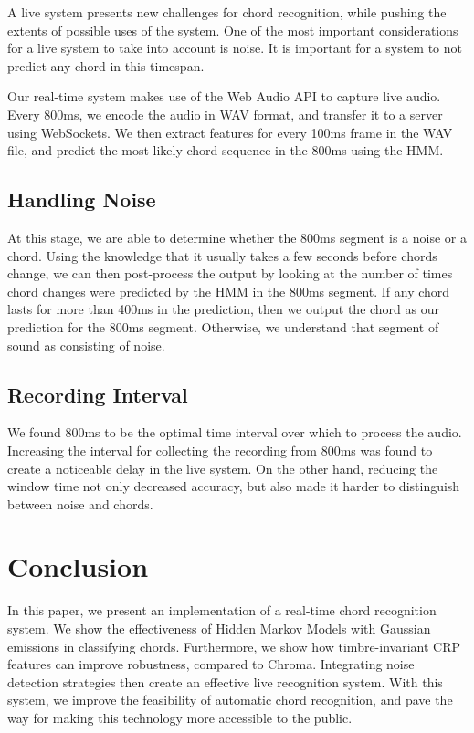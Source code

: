 \documentclass{article}
\begin{document}
A live system presents new challenges for chord recognition, while pushing the
extents of possible uses of the system.
One of the most important considerations for a live system to take into account
is noise. It is important for a system to not predict any chord in this
timespan.

Our real-time system makes use of the Web Audio API to capture live audio. Every
800ms, we encode the audio in WAV format, and transfer it to a server using
WebSockets. We then extract features for every 100ms frame in the WAV file, and
predict the most likely chord sequence in the 800ms using the HMM.

\subsection{Handling Noise}
At this stage, we are able to determine whether the 800ms segment is a noise or
a chord. Using the knowledge that it usually takes a few seconds before chords
change, we can then post-process the output by looking at the number of times
chord changes were predicted by the HMM in the 800ms segment. If any chord lasts
for more than 400ms in the prediction, then we output the chord as our
prediction for the 800ms segment. Otherwise, we understand that segment of sound
as consisting of noise.

\subsection{Recording Interval}
We found 800ms to be the optimal time interval over which to process the audio. Increasing the interval 
for collecting the recording from 800ms was found to create a noticeable delay in the live system. On the other hand, reducing the window time not only decreased accuracy, but also made it harder to distinguish between noise and chords.

\section{Conclusion}
In this paper, we present an implementation of a real-time chord recognition system. We show the effectiveness of Hidden Markov Models with Gaussian emissions in classifying chords. Furthermore, we show how timbre-invariant CRP features can improve robustness, compared to Chroma. Integrating noise detection strategies then create an effective live recognition system. With this system, we improve the feasibility of automatic chord recognition, and pave the way for making this technology more accessible to the public.




\end{document}
